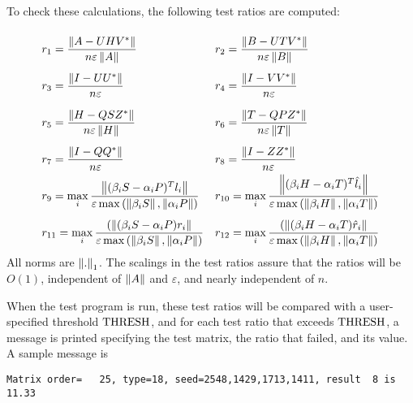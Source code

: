 To check these calculations, the following test ratios are computed:
\begin{displaymath}
   \bigarray
   \renewcommand{\arraystretch}{2.7}
   \begin{array}{ll}
	r_1 = \frac{ \leftnorm A - U H V^* \rightnorm }
                   { n\varepsilon \leftnorm A\rightnorm } &
	r_2 = \frac{ \leftnorm B - U T V^* \rightnorm }
                   { n\varepsilon \leftnorm B\rightnorm } \\
	r_3 = \frac{ \leftnorm I - U U^*   \rightnorm }
                   { n         \varepsilon } &
	r_4 = \frac{ \leftnorm I - V V^*   \rightnorm }
                   { n         \varepsilon } \\
	r_5 = \frac{ \leftnorm H - Q S Z^* \rightnorm }
                   { n \varepsilon \leftnorm H\rightnorm } &
	r_6 = \frac{ \leftnorm T - Q P Z^* \rightnorm }
                   { n \varepsilon \leftnorm T\rightnorm } \\
	r_7 = \frac{ \leftnorm I - Q Q^*   \rightnorm }
                   { n          \varepsilon } &
	r_8 = \frac{ \leftnorm I - Z Z^*   \rightnorm }
                   { n          \varepsilon } \\
	r_9 = \max_i
	      \frac{\leftnorm(\beta_i S - \alpha_i P )^T l_i\rightnorm }
	      { \varepsilon\max\left(\leftnorm \beta_i S \rightnorm,
                                     \leftnorm \alpha_i P\rightnorm \right)}&
	r_{10} = \max_i
	      \frac{\leftnorm(\beta_i H - \alpha_i T )^T \hat{l}_i\rightnorm }
	      { \varepsilon\max\left(\leftnorm \beta_i H \rightnorm,
                                     \leftnorm \alpha_i T\rightnorm \right)} \\
	r_{11}=\max_i
	      \frac{ (\leftnorm(\beta_i S - \alpha_i P )r_i\rightnorm }
	      { \varepsilon \max\left(\leftnorm \beta_i S \rightnorm,
                                     \leftnorm \alpha_i P\rightnorm \right)} &
	r_{12}=\max_i
	      \frac{ (\leftnorm(\beta_i H - \alpha_i T )\hat{r}_i\rightnorm }
	      { \varepsilon \max\left(\leftnorm \beta_i H \rightnorm,
                                     \leftnorm \alpha_i T\rightnorm \right)}
    \end{array}
\end{displaymath}
All norms are $\left\|{.}\right\|_1$.
The scalings in the test ratios assure that the ratios will be $O(1)$,
independent of $\left\| A\right\|$ and $\varepsilon$,
and nearly independent of $n$.

When the test program is run, these test ratios will be compared
with a user-specified threshold ${\rm THRESH}$, and for each test ratio
that exceeds ${\rm THRESH}$, a message is printed specifying the
test matrix, the ratio that failed, and its value.
A sample message is 
\begin{verbatim}
Matrix order=   25, type=18, seed=2548,1429,1713,1411, result  8 is   11.33
\end{verbatim}

